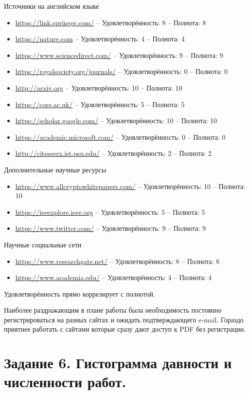 \documentclass[a4paper, 12pt]{report}		%
\begin{document}
Источники на английском языке
\begin{itemize}
\item \url{https://link.springer.com/} -- Удовлетворённость: 8 -- Полнота: 8
\item \url{https://nature.com} -- Удовлетворённость: 4 -- Полнота: 4
\item \url{https://www.sciencedirect.com/} -- Удовлетворённость: 9 -- Полнота: 9
\item \url{https://royalsociety.org/journals/} -- Удовлетворённость: 0 -- Полнота: 0
\item \url{http://arxiv.org} -- Удовлетворённость: 10 -- Полнота: 10
\item \url{https://core.ac.uk/} -- Удовлетворённость: 5 -- Полнота: 5
\item \url{https://scholar.google.com/} -- Удовлетворённость: 10 -- Полнота: 10
\item \url{https://academic.microsoft.com/} -- Удовлетворённость: 0 -- Полнота: 0
\item \url{http://citeseerx.ist.psu.edu/} -- Удовлетворённость: 2 -- Полнота: 2
\end{itemize}

Дополнительные научные ресурсы
\begin{itemize}
\item \url{https://www.allcryptowhitepapers.com/} -- Удовлетворённость: 10 -- Полнота: 10
\item \url{https://ieeexplore.ieee.org} -- Удовлетворённость: 5 -- Полнота: 5
\item \url{https://www.twitter.com/} -- Удовлетворённость: 9 -- Полнота: 9
\end{itemize}

Научные социальные сети
\begin{itemize}
\item \url{https://www.researchgate.net/} -- Удовлетворённость: 8 -- Полнота: 8
\item \url{https://www.academia.edu/} -- Удовлетворённость: 4 -- Полнота: 4
\end{itemize}

Удовлетворённость прямо коррелирует с полнотой.


Наиболее раздражающим в плане работы была необходимость постоянно регистрироваться на разных сайтах и ожидать подтверждающего e-mail. Гораздо приятнее работать с сайтами которые сразу дают доступ к PDF без регистрации.



\chapter*{Задание 6. Гистограмма давности и численности работ.}
\end{document}
